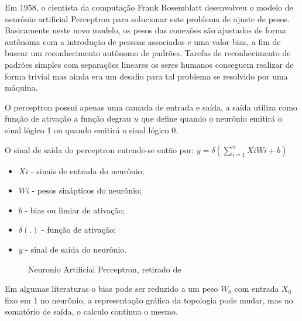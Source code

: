 \documentclass[	12pt, Times, openright, twoside, a4paper, english, brazil]{abntex2}
\begin{document}
            Em 1958, o cientista da computação Frank Rosemblatt desenvolveu o modelo de neurônio artificial Perceptron para solucionar este problema de ajuste de pesos.
            Basicamente neste novo modelo, os pesos das conexões são ajustados de forma autônoma com a introdução de pessoas associados e uma valor bias, a fim de buscar um reconhecimento autônomo de padrões. Tarefas de reconhecimento de padrões simples com separações lineares os seres humanos conseguem realizar de forma trivial mas ainda era um desafio para tal problema se resolvido por uma máquina.

            O perceptron \cite{Flavia2014} possui apenas uma camada de entrada e saída, a saída utiliza como função de ativação a função degrau $u$ que define quando o neurônio emitirá o sinal lógico 1 ou quando emitirá o sinal lógico 0.

            O sinal de saída do perceptron entende-se então por:
            $y= \delta(\sum_{i=1}^{n}XiWi+b)$
            \begin{itemize}
            	\item $ Xi $ - sinais de entrada do neurônio;
            	\item $ Wi $ - pesos sinápticos do neurônio;
            	\item $ b $ - bias ou limiar de ativação;
            	\item $ \delta(.) $ - função de ativação;
            	\item $ y $ - sinal de saída do neurônio.
            \end{itemize}
			
            \begin{figure}[!ht]
            \caption{Neuronio Artificial Perceptron, retirado de \cite{Junior2007} \cite{}\label{fig:perceptron}}
            \end{figure}
			
			     Em algumas literaturas o bias pode ser reduzido a um peso $W_0$ com entrada $X_0$ fixo em 1 no neurônio, a representação gráfica da topologia pode mudar, mas no somatório de saída, o calculo continua o mesmo.
			
\end{document}

